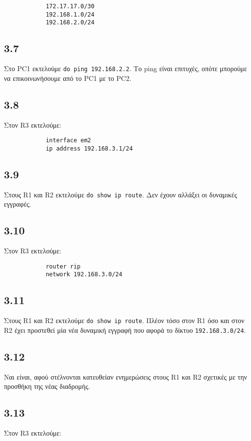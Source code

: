 \documentclass[a4paper, 12pt]{article}
\begin{document}
		\begin{verbatim}
			172.17.17.0/30
			192.168.1.0/24
			192.168.2.0/24
		\end{verbatim}

	\subsection*{3.7}
		Στο PC1 εκτελούμε \verb|do ping 192.168.2.2|. Το ping είναι επιτυχές, οπότε μπορούμε να επικοινωνήσουμε από το PC1 με το PC2.

	\subsection*{3.8}
		Στον R3 εκτελούμε:
		
		\begin{verbatim}
			interface em2 
			ip address 192.168.3.1/24
		\end{verbatim}

	\subsection*{3.9}
		Στους R1 και R2 εκτελούμε \verb|do show ip route|. Δεν έχουν αλλάξει οι δυναμικές εγγραφές.

	\subsection*{3.10}
		Στον R3 εκτελούμε:
		
		\begin{verbatim}
			router rip
			network 192.168.3.0/24
		\end{verbatim}

	\subsection*{3.11}
		Στους R1 και R2 εκτελούμε \verb|do show ip route|. Πλέον τόσο στον R1 όσο και στον R2 έχει προστεθεί μία νέα δυναμική εγγραφή που αφορά το δίκτυο \verb|192.168.3.0/24|.

	\subsection*{3.12}
		Ναι είναι, αφού στέλνονται κατευθείαν ενημερώσεις στους R1 και R2 σχετικές με την προσθήκη της νέας διαδρομής.

	\subsection*{3.13}
		Στον R3 εκτελούμε:
		
\end{document}
